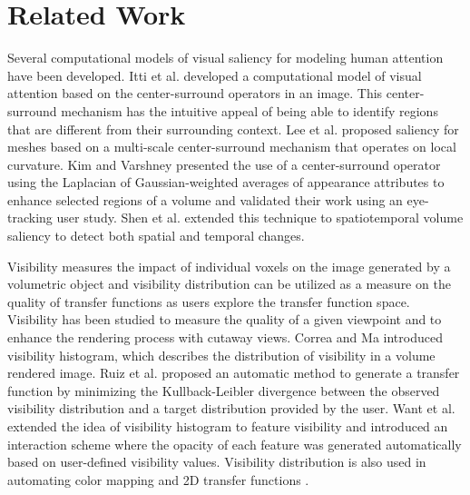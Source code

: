 \section{Related Work}
Several computational models of visual saliency for modeling human attention have been developed.
Itti et al. \cite{itti_model_1998} developed a computational model of visual attention based on the center-surround operators in an image. This center-surround mechanism has the intuitive appeal of being able to identify regions that are different from their surrounding context.
Lee et al. \cite{lee_mesh_2005} proposed saliency for meshes based on a multi-scale center-surround mechanism that operates on local curvature. Kim and Varshney \cite{kim_saliency-guided_2006} presented the use of a center-surround operator using the Laplacian of Gaussian-weighted averages of appearance attributes to enhance selected regions of a volume and validated their work using an eye-tracking user study. Shen et al. \cite{shen_spatiotemporal_2015} extended this technique to spatiotemporal volume saliency to detect both spatial and temporal changes.

Visibility measures the impact of individual voxels on the image generated by a volumetric object and visibility distribution can be utilized as a measure on the quality of transfer functions as users explore the transfer function space. Visibility has been studied to measure the quality of a given viewpoint \cite{bordoloi_view_2005} \cite{viola_importance-driven_2004} and to enhance the rendering process with cutaway views.
Correa and Ma \cite{correa_visibility_2011} introduced visibility histogram, which describes the distribution of visibility in a volume rendered image.
Ruiz et al. \cite{ruiz_automatic_2011} proposed an automatic method to generate a transfer function by minimizing the Kullback-Leibler divergence between the observed visibility distribution and a target distribution provided by the user. Want et al. \cite{wang_efficient_2011} extended the idea of visibility histogram to feature visibility and introduced an interaction scheme where the opacity of each feature was generated automatically based on user-defined visibility values. Visibility distribution is also used in automating color mapping \cite{cai_automatic_2013} and 2D transfer functions \cite{qin_voxel_2015}.



